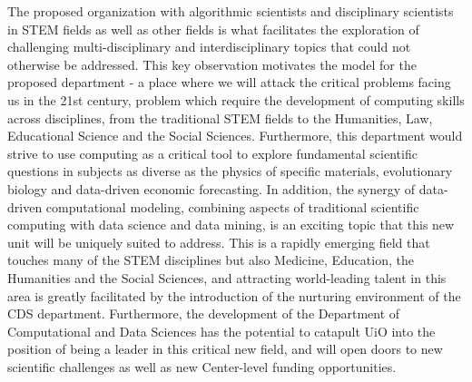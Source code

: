 \documentclass[oneside,final,10pt]{article}
\begin{document}
The proposed organization with  algorithmic scientists and disciplinary scientists in STEM fields as well as other  fields is what facilitates the exploration of challenging multi-disciplinary and
interdisciplinary topics that could not otherwise be addressed. This key observation motivates
the model for the proposed department - a place where we will attack the critical problems
facing us in the 21st century, problem which require the development of computing skills across disciplines, from the traditional STEM fields to the Humanities, Law, Educational Science  and the Social Sciences. 
Furthermore, this department would strive to use
computing as a critical tool to explore fundamental scientific questions in subjects as diverse as
the physics of specific materials, evolutionary biology and data-driven economic forecasting. In addition, the synergy of data-driven computational
modeling, combining aspects of traditional scientific computing with data science and data
mining, is an exciting topic that this new unit will be uniquely suited to address. This is a rapidly
emerging field that touches many of the STEM disciplines but also Medicine, Education, the Humanities and the Social Sciences, and attracting world-leading talent in
this area is greatly facilitated by the introduction of the nurturing environment of the CDS department. Furthermore, the development of the Department of Computational and Data Sciences
has the potential to  catapult UiO into the position of being a
leader in this critical new field, and will open doors to new scientific challenges as well
as new Center-level funding opportunities.
\end{document}
